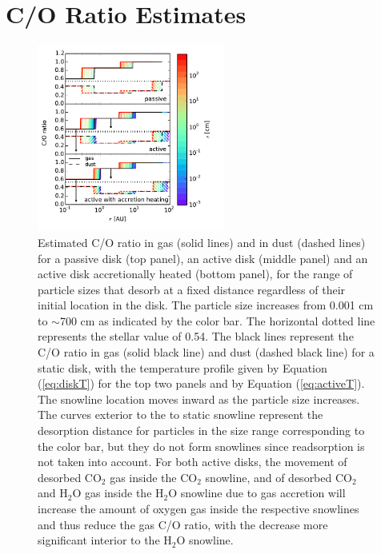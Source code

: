 \documentclass[apj]{emulateapj}
\newcommand{\emgr}[1]{\emph{ \color{gray} #1}}
\begin{document}


\section{C/O Ratio Estimates}
\label{sec:COratio}

\begin{figure}[h!]
\centering
\includegraphics[width=0.55\textwidth]{C_O_ratio_passive_active_disk_many_colorbar_complete_new.pdf}
\caption{Estimated C/O ratio in gas (solid lines) and in dust (dashed lines) for a passive disk (top panel), an active disk (middle panel) and an active disk accretionally heated (bottom panel), for the range of particle sizes that desorb at a fixed distance regardless of their initial location in the disk. The particle size increases from 0.001 cm to $\sim$700 cm as indicated by the color bar. The horizontal dotted line represents the stellar value of 0.54. The black lines represent the C/O ratio in gas (solid black line) and dust (dashed black line) for a static disk, with the temperature profile given by Equation (\ref{eq:diskT}) for the top two panels and by Equation (\ref{eq:activeT}). The snowline location moves inward as the particle size increases. The curves exterior to the to static snowline represent the desorption distance for particles in the size range corresponding to the color bar, but they do not form snowlines since readsorption is not taken into account. For both active disks, the movement of desorbed CO$_2$ gas inside the CO$_2$ snowline, and of desorbed CO$_2$ and H$_2$O gas inside the H$_2$O snowline due to gas accretion will increase the amount of oxygen gas inside the respective snowlines and thus reduce the gas C/O ratio, with the decrease more significant interior to the H$_2$O snowline.}
\label{fig:CO_ratio}
\end{figure}
\end{document}
